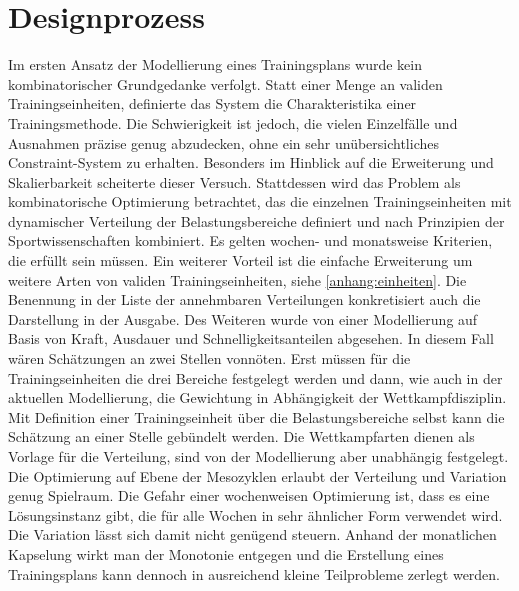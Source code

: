 \section{Designprozess}
Im ersten Ansatz der Modellierung eines Trainingsplans wurde kein kombinatorischer Grundgedanke verfolgt. Statt einer Menge an validen Trainingseinheiten, definierte das System die Charakteristika einer Trainingsmethode. Die Schwierigkeit ist jedoch, die vielen Einzelfälle und Ausnahmen präzise genug abzudecken, ohne ein sehr unübersichtliches Constraint-System zu erhalten. Besonders im Hinblick auf die Erweiterung und Skalierbarkeit scheiterte dieser Versuch. Stattdessen wird das Problem als kombinatorische Optimierung betrachtet, das die einzelnen Trainingseinheiten mit dynamischer Verteilung der Belastungsbereiche definiert und nach Prinzipien der Sportwissenschaften kombiniert. Es gelten wochen- und monatsweise Kriterien, die erfüllt sein müssen. Ein weiterer Vorteil ist die einfache Erweiterung um weitere Arten von validen Trainingseinheiten, siehe \ref{anhang:einheiten}. Die Benennung in der Liste der annehmbaren Verteilungen konkretisiert auch die Darstellung in der Ausgabe. \newline
Des Weiteren wurde von einer Modellierung auf Basis von Kraft, Ausdauer und Schnelligkeitsanteilen abgesehen. In diesem Fall wären Schätzungen an zwei Stellen vonnöten. Erst müssen für die Trainingseinheiten die drei Bereiche festgelegt werden und dann, wie auch in der aktuellen Modellierung, die Gewichtung in Abhängigkeit der Wettkampfdisziplin. Mit Definition einer Trainingseinheit über die Belastungsbereiche selbst kann die Schätzung an einer Stelle gebündelt werden. Die Wettkampfarten dienen als Vorlage für die Verteilung, sind von der Modellierung aber unabhängig festgelegt. \newline
Die Optimierung auf Ebene der Mesozyklen erlaubt der Verteilung und Variation genug Spielraum. Die Gefahr einer wochenweisen Optimierung ist, dass es eine Lösungsinstanz gibt, die für alle Wochen in sehr ähnlicher Form verwendet wird. Die Variation lässt sich damit nicht genügend steuern. Anhand der monatlichen Kapselung wirkt man der Monotonie entgegen und die Erstellung eines Trainingsplans kann dennoch in ausreichend kleine Teilprobleme zerlegt werden.


